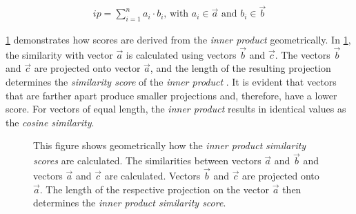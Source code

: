 \documentclass{article}
\begin{document}
\begin{align}
	 ip = \sum_{i=1}^{n}{a_{i} \cdot b_{i}} \text{, with } a_{i} \in \vec{a} \text{ and } b_{i} \in \vec{b}
\end{align}

\cref{innerProductFigure} demonstrates how scores are derived from the \textit{inner product} geometrically. In \cref{innerProductFigure}, the similarity with vector $\vec{a}$ is calculated using vectors $\vec{b}$ and $\vec{c}$. The vectors $\vec{b}$ and $\vec{c}$ are projected onto vector $\vec{a}$, and the length of the resulting projection determines the \textit{similarity score} of the \textit{inner product} \cite[pp.~10ff]{linearAlgebra}. It is evident that vectors that are farther apart produce smaller projections and, therefore, have a lower score. For vectors of equal length, the \textit{inner product} results in identical values as the \textit{cosine similarity}.

\begin{figure}[H]
    \centering
{}
\caption{This figure shows geometrically how the \textit{inner product} \textit{similarity scores} are calculated. The similarities between vectors $\vec{a}$ and $\vec{b}$ and vectors $\vec{a}$ and $\vec{c}$ are calculated. Vectors $\vec{b}$ and $\vec{c}$ are projected onto $\vec{a}$. The length of the respective projection on the vector $\vec{a}$ then determines the \textit{inner product similarity score}.}
\label{innerProductFigure}
\end{figure}
\end{document}

